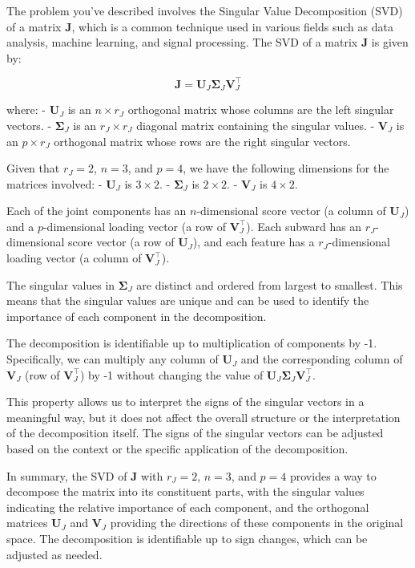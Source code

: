 The problem you've described involves the Singular Value Decomposition (SVD) of a matrix \( \boldsymbol{J} \), which is a common technique used in various fields such as data analysis, machine learning, and signal processing. The SVD of a matrix \( \boldsymbol{J} \) is given by:

\[
\boldsymbol{J} = \boldsymbol{U}_J \boldsymbol{\Sigma}_J \boldsymbol{V}_J^\top
\]

where:
- \( \boldsymbol{U}_J \) is an \( n \times r_J \) orthogonal matrix whose columns are the left singular vectors.
- \( \boldsymbol{\Sigma}_J \) is an \( r_J \times r_J \) diagonal matrix containing the singular values.
- \( \boldsymbol{V}_J \) is an \( p \times r_J \) orthogonal matrix whose rows are the right singular vectors.

Given that \( r_J = 2 \), \( n = 3 \), and \( p = 4 \), we have the following dimensions for the matrices involved:
- \( \boldsymbol{U}_J \) is \( 3 \times 2 \).
- \( \boldsymbol{\Sigma}_J \) is \( 2 \times 2 \).
- \( \boldsymbol{V}_J \) is \( 4 \times 2 \).

Each of the joint components has an \( n \)-dimensional score vector (a column of \( \boldsymbol{U}_J \)) and a \( p \)-dimensional loading vector (a row of \( \boldsymbol{V}_J^\top \)). Each subward has an \( r_J \)-dimensional score vector (a row of \( \boldsymbol{U}_J \)), and each feature has a \( r_J \)-dimensional loading vector (a column of \( \boldsymbol{V}_J^\top \)).

The singular values in \( \boldsymbol{\Sigma}_J \) are distinct and ordered from largest to smallest. This means that the singular values are unique and can be used to identify the importance of each component in the decomposition.

The decomposition is identifiable up to multiplication of components by -1. Specifically, we can multiply any column of \( \boldsymbol{U}_J \) and the corresponding column of \( \boldsymbol{V}_J \) (row of \( \boldsymbol{V}_J^\top \)) by -1 without changing the value of \( \boldsymbol{U}_J \boldsymbol{\Sigma}_J \boldsymbol{V}_J^\top \).

This property allows us to interpret the signs of the singular vectors in a meaningful way, but it does not affect the overall structure or the interpretation of the decomposition itself. The signs of the singular vectors can be adjusted based on the context or the specific application of the decomposition.

In summary, the SVD of \( \boldsymbol{J} \) with \( r_J = 2 \), \( n = 3 \), and \( p = 4 \) provides a way to decompose the matrix into its constituent parts, with the singular values indicating the relative importance of each component, and the orthogonal matrices \( \boldsymbol{U}_J \) and \( \boldsymbol{V}_J \) providing the directions of these components in the original space. The decomposition is identifiable up to sign changes, which can be adjusted as needed.